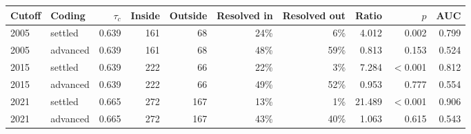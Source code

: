 \begin{tabular}{@{}llrrrrrrrr@{}}
\toprule
Cutoff & Coding & $\tau_c$ & Inside & Outside & Resolved in & Resolved out & Ratio & $p$ & AUC \\
\midrule
2005 & settled & 0.639 & 161 & 68 & 24\% & 6\% & 4.012 & 0.002 & 0.799 \\
2005 & advanced & 0.639 & 161 & 68 & 48\% & 59\% & 0.813 & 0.153 & 0.524 \\
2015 & settled & 0.639 & 222 & 66 & 22\% & 3\% & 7.284 & $<$0.001 & 0.812 \\
2015 & advanced & 0.639 & 222 & 66 & 49\% & 52\% & 0.953 & 0.777 & 0.554 \\
2021 & settled & 0.665 & 272 & 167 & 13\% & 1\% & 21.489 & $<$0.001 & 0.906 \\
2021 & advanced & 0.665 & 272 & 167 & 43\% & 40\% & 1.063 & 0.615 & 0.543 \\
\bottomrule
\end{tabular}
